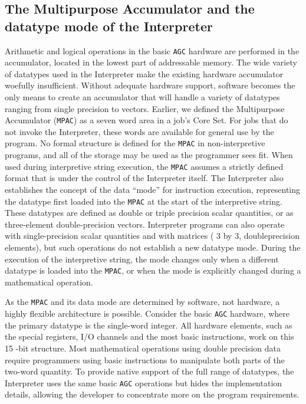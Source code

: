 \documentclass[refcap, oxford]{ahsan}
\begin{document}
\subsection{The Multipurpose Accumulator and the datatype mode of the Interpreter}
Arithmetic and logical operations in the basic \texttt{AGC} hardware are performed in the accumulator, located in the lowest part of addressable memory. The wide variety of datatypes used in the Interpreter make the existing hardware accumulator woefully insufficient. Without adequate hardware support, software becomes the only means to create an accumulator that will handle a variety of datatypes ranging from single precision to vectors. Earlier, we defined the Multipurpose Accumulator (\texttt{MPAC}) as a seven word area in a job's Core Set. For jobs that do not invoke the Interpreter, these words are available for general use by the program. No formal structure is defined for the \texttt{MPAC} in non-interpretive programs, and all of the storage may be used as the programmer sees fit. When used during interpretive string execution, the \texttt{MPAC} assumes a strictly defined format that is under the control of the Interpreter itself. The Interpreter also establishes the concept of the data ``mode'' for instruction execution, representing the datatype first loaded into the \texttt{MPAC} at the start of the interpretive string. These datatypes are defined as double or triple precision scalar quantities, or as three-element double-precision vectors. Interpreter programs can also operate with single-precision scalar quantities and with matrices ( 3 by 3, doubleprecision elements), but such operations do not establish a new datatype mode. During the execution of the interpretive string, the mode changes only when a different datatype is loaded into the \texttt{MPAC}, or when the mode is explicitly changed during a mathematical operation.

As the \texttt{MPAC} and its data mode are determined by software, not hardware, a highly flexible architecture is possible. Consider the basic \texttt{AGC} hardware, where the primary datatype is the single-word integer. All hardware elements, such as the special registers, I/O channels and the most basic instructions, work on this 15 -bit structure. Most mathematical operations using double precision data require programmers using basic instructions to manipulate both parts of the two-word quantity. To provide native support of the full range of datatypes, the Interpreter uses the same basic \texttt{AGC} operations but hides the implementation details, allowing the developer to concentrate more on the program requirements.
\end{document}
